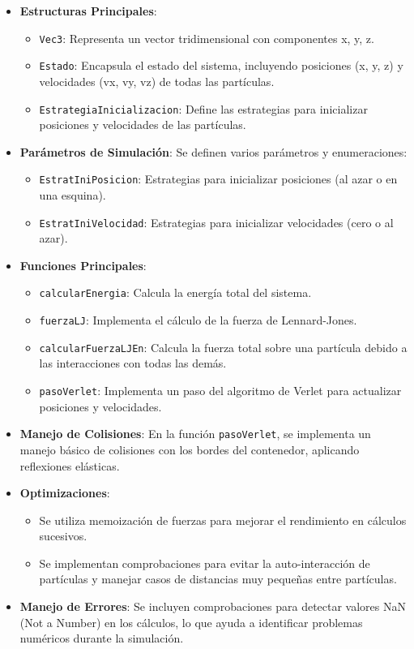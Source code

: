 \documentclass[twocolumn]{article}
\begin{document}
\begin{itemize}
    \item \textbf{Estructuras Principales}:
    \begin{itemize}
        \item \texttt{Vec3}: Representa un vector tridimensional con componentes x, y, z.
        \item \texttt{Estado}: Encapsula el estado del sistema, incluyendo posiciones (x, y, z) y velocidades (vx, vy, vz) de todas las partículas.
        \item \texttt{EstrategiaInicializacion}: Define las estrategias para inicializar posiciones y velocidades de las partículas.
    \end{itemize}

    \item \textbf{Parámetros de Simulación}: Se definen varios parámetros y enumeraciones:
    \begin{itemize}
        \item \texttt{EstratIniPosicion}: Estrategias para inicializar posiciones (al azar o en una esquina).
        \item \texttt{EstratIniVelocidad}: Estrategias para inicializar velocidades (cero o al azar).
    \end{itemize}

    \item \textbf{Funciones Principales}:
    \begin{itemize}
        \item \texttt{calcularEnergia}: Calcula la energía total del sistema.
        \item \texttt{fuerzaLJ}: Implementa el cálculo de la fuerza de Lennard-Jones.
        \item \texttt{calcularFuerzaLJEn}: Calcula la fuerza total sobre una partícula debido a las interacciones con todas las demás.
        \item \texttt{pasoVerlet}: Implementa un paso del algoritmo de Verlet para actualizar posiciones y velocidades.
    \end{itemize}

    \item \textbf{Manejo de Colisiones}: En la función \texttt{pasoVerlet}, se implementa un manejo básico de colisiones con los bordes del contenedor, aplicando reflexiones elásticas.

    \item \textbf{Optimizaciones}:
    \begin{itemize}
        \item Se utiliza memoización de fuerzas para mejorar el rendimiento en cálculos sucesivos.
        \item Se implementan comprobaciones para evitar la auto-interacción de partículas y manejar casos de distancias muy pequeñas entre partículas.
    \end{itemize}

    \item \textbf{Manejo de Errores}: Se incluyen comprobaciones para detectar valores NaN (Not a Number) en los cálculos, lo que ayuda a identificar problemas numéricos durante la simulación.
\end{itemize}
\end{document}
